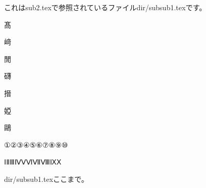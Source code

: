 これはsub2.texで参照されているファイルdir/subsub1.texです。

髙

﨑

閒

礴

搢

婭

鷗

①②③④⑤⑥⑦⑧⑨⑩

ⅠⅡⅢⅣⅤⅥⅦⅧⅨⅩ

dir/subsub1.texここまで。
